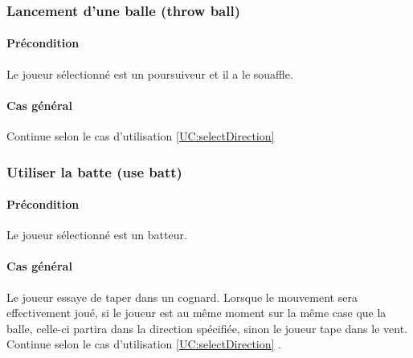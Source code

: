 \subsubsection{Lancement d'une balle (throw ball)}
    \paragraph{Précondition} Le joueur sélectionné est un \gls{poursuiveur} et il a le \gls{souaffle}.
    \paragraph{Cas général} Continue selon le cas d'utilisation \ref{UC:selectDirection}

\subsubsection{Utiliser la batte (use batt)}
    \paragraph{Précondition} Le joueur sélectionné est un \gls{batteur}.
    \paragraph{Cas général} Le joueur essaye de taper dans un \gls{cognard}. Lorsque le mouvement sera effectivement joué, si le joueur est au même moment sur la même case que la balle, celle-ci partira dans la direction spécifiée, sinon le joueur tape dans le vent. Continue selon le cas d'utilisation \ref{UC:selectDirection} .


